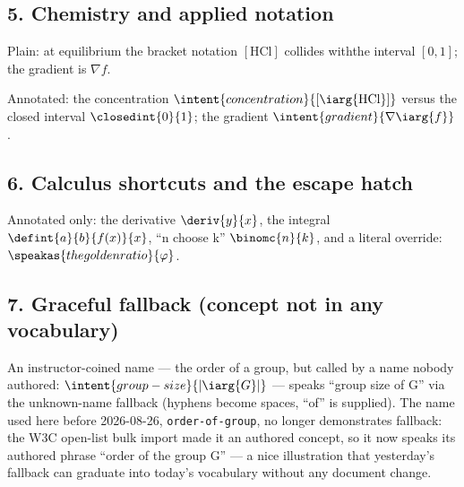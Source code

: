 \documentclass[11pt]{article}
\begin{document}
\subsection*{5. Chemistry and applied notation}

Plain: at equilibrium the bracket notation $[\mathrm{HCl}]$ collides withthe interval $[0,1]$; the gradient is $\nabla f$.

Annotated: the concentration
$\intent{concentration}{\left[\iarg{\mathrm{HCl}}\right]}$ versus the closed
interval $\closedint{0}{1}$; the gradient
$\intent{gradient}{\nabla\iarg{f}}$.

\subsection*{6. Calculus shortcuts and the escape hatch}

Annotated only: the derivative $\deriv{y}{x}$, the integral
$\defint{a}{b}{f(x)}{x}$, ``n choose k'' $\binomc{n}{k}$, and a literal
override: $\speakas{the golden ratio}{\varphi}$.

\subsection*{7. Graceful fallback (concept not in any vocabulary)}

An instructor-coined name --- the order of a group, but called by a name
nobody authored: $\intent{group-size}{\left|\iarg{G}\right|}$ --- speaks
``group size of G'' via the unknown-name fallback (hyphens become spaces,
``of'' is supplied). The name used here before 2026-08-26,
\texttt{order-of-group}, no longer demonstrates fallback: the W3C open-list
bulk import made it an authored concept, so it now speaks its authored
phrase ``order of the group G'' --- a nice illustration that yesterday's
fallback can graduate into today's vocabulary without any document change.
\end{document}
